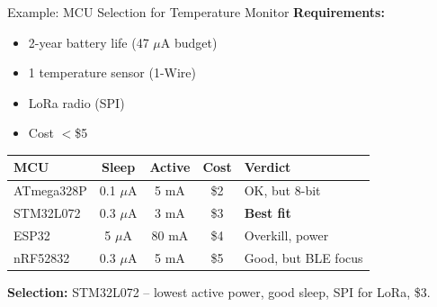 \documentclass[aspectratio=169,11pt]{beamer}
\begin{document}
\begin{frame}{Example: MCU Selection for Temperature Monitor}
    \textbf{Requirements:}
    \begin{itemize}
        \item 2-year battery life (47 $\mu$A budget)
        \item 1 temperature sensor (1-Wire)
        \item LoRa radio (SPI)
        \item Cost $<$\$5
    \end{itemize}
    
    \vspace{0.3cm}
    \begin{table}
        \centering
        \small
        \begin{tabular}{@{}lcccl@{}}
            \toprule
            \textbf{MCU} & \textbf{Sleep} & \textbf{Active} & \textbf{Cost} & \textbf{Verdict} \\
            \midrule
            ATmega328P & 0.1 $\mu$A & 5 mA & \$2 & OK, but 8-bit \\
            STM32L072 & 0.3 $\mu$A & 3 mA & \$3 & \textbf{Best fit} \\
            ESP32 & 5 $\mu$A & 80 mA & \$4 & Overkill, power \\
            nRF52832 & 0.3 $\mu$A & 5 mA & \$5 & Good, but BLE focus \\
            \bottomrule
        \end{tabular}
    \end{table}
    
    \vspace{0.2cm}
    \textbf{Selection:} STM32L072 -- lowest active power, good sleep, SPI for LoRa, \$3.
\end{frame}
\end{document}
